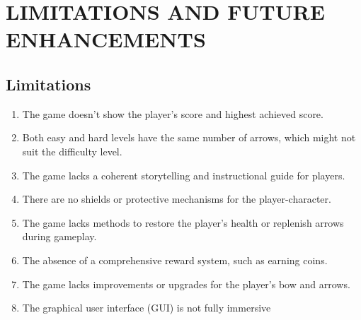 \section{LIMITATIONS AND FUTURE ENHANCEMENTS}

\subsection{Limitations}
\begin{enumerate}
	\item The game doesn't show the player's score and highest achieved score.
	\item Both easy and hard levels have the same number of arrows, which might not suit the difficulty level.
	
	\item The game lacks a coherent storytelling and instructional guide for players.
	\item There are no shields or protective mechanisms for the player-character.
	\item The game lacks methods to restore the player's health or replenish arrows during gameplay.
	\item The absence of a comprehensive reward system, such as earning coins.
	\item The game lacks improvements or upgrades for the player's bow and arrows.
	\item The graphical user interface (GUI) is not fully immersive
\end{enumerate}



